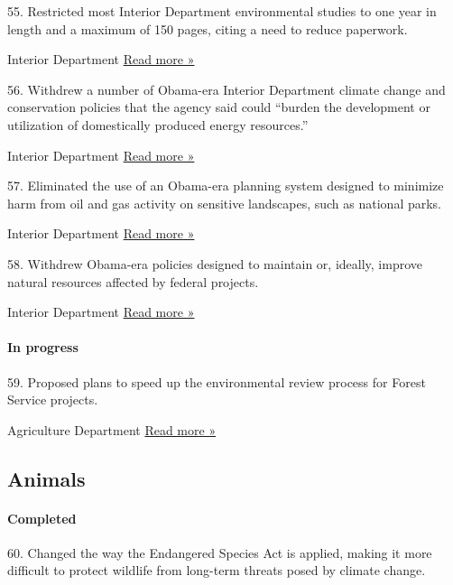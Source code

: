 55. Restricted most Interior Department environmental studies to one
year in length and a maximum of 150 pages, citing a need to reduce
paperwork.

 Interior Department \textbar{}
\href{https://www.eenews.net/stories/1060059865}{Read more »}

56. Withdrew a number of Obama-era Interior Department climate change
and conservation policies that the agency said could ``burden the
development or utilization of domestically produced energy resources.''

 Interior Department \textbar{}
\href{https://www.hcn.org/articles/climate-change-interior-department-revokes-climate-change-and-mitigation-policies}{Read
more »}

57. Eliminated the use of an Obama-era planning system designed to
minimize harm from oil and gas activity on sensitive landscapes, such as
national parks.

 Interior Department \textbar{}
\href{https://climate.law.columbia.edu/content/blm-issues-internal-policy-streamline-oil-and-gas-permitting-0}{Read
more »}

58. Withdrew Obama-era policies designed to maintain or, ideally,
improve natural resources affected by federal projects.

 Interior Department \textbar{}
\href{https://www.eenews.net/stories/1060091417}{Read more »}

\hypertarget{in-progress-2}{%
\paragraph{In progress}\label{in-progress-2}}

59. Proposed plans to speed up the environmental review process for
Forest Service projects.

 Agriculture Department \textbar{}
\href{https://www.fs.fed.us/emc/nepa/revisions/includes/docs/36CFR220ProposedRuleFRN.pdf}{Read
more »}

\hypertarget{animals}{%
\subsection{Animals}\label{animals}}

\hypertarget{completed-3}{%
\paragraph{Completed}\label{completed-3}}

60. Changed the way the Endangered Species Act is applied, making it
more difficult to protect wildlife from long-term threats posed by
climate change.

